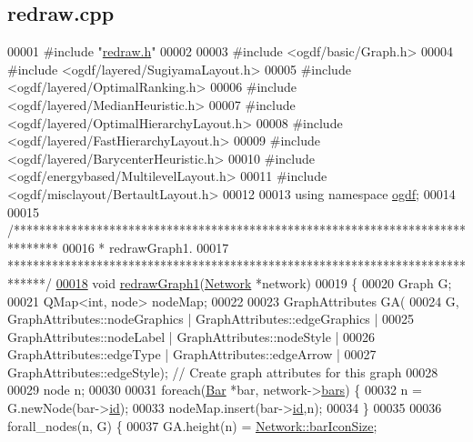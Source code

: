 \hypertarget{redraw_8cpp_source}{}\subsection{redraw.\+cpp}
\label{redraw_8cpp_source}

\begin{DoxyCode}
00001 \textcolor{preprocessor}{#include "\hyperlink{redraw_8h}{redraw.h}"}
00002 
00003 \textcolor{preprocessor}{#include <ogdf/basic/Graph.h>}
00004 \textcolor{preprocessor}{#include <ogdf/layered/SugiyamaLayout.h>}
00005 \textcolor{preprocessor}{#include <ogdf/layered/OptimalRanking.h>}
00006 \textcolor{preprocessor}{#include <ogdf/layered/MedianHeuristic.h>}
00007 \textcolor{preprocessor}{#include <ogdf/layered/OptimalHierarchyLayout.h>}
00008 \textcolor{preprocessor}{#include <ogdf/layered/FastHierarchyLayout.h>}
00009 \textcolor{preprocessor}{#include <ogdf/layered/BarycenterHeuristic.h>}
00010 \textcolor{preprocessor}{#include <ogdf/energybased/MultilevelLayout.h>}
00011 \textcolor{preprocessor}{#include <ogdf/misclayout/BertaultLayout.h>}
00012 
00013 \textcolor{keyword}{using namespace }\hyperlink{namespaceogdf}{ogdf};
00014 
00015 \textcolor{comment}{/*******************************************************************************}
00016 \textcolor{comment}{ * redrawGraph1.}
00017 \textcolor{comment}{ ******************************************************************************/}
\hypertarget{redraw_8cpp_source_l00018}{}\hyperlink{redraw_8h_ae0faf7c4b627874b04cd8fd6d32bc8aa}{00018} \textcolor{keywordtype}{void} \hyperlink{redraw_8cpp_ae0faf7c4b627874b04cd8fd6d32bc8aa}{redrawGraph1}(\hyperlink{class_network}{Network} *network)
00019 \{
00020   Graph G;
00021   QMap<int, node> nodeMap;
00022 
00023   GraphAttributes GA(
00024     G, GraphAttributes::nodeGraphics | GraphAttributes::edgeGraphics |
00025     GraphAttributes::nodeLabel | GraphAttributes::nodeStyle |
00026     GraphAttributes::edgeType | GraphAttributes::edgeArrow |
00027     GraphAttributes::edgeStyle);  \textcolor{comment}{// Create graph attributes for this graph}
00028 
00029   node n;
00030 
00031   \textcolor{keywordflow}{foreach}(\hyperlink{class_bar}{Bar} *bar, network->\hyperlink{class_network_a7fe628f7de34a96235cbd3f2cee4aff2}{bars}) \{
00032     n = G.newNode(bar->\hyperlink{class_bar_a9dc5c6a6d44fe412ae34ef8a881b8dce}{id});
00033     nodeMap.insert(bar->\hyperlink{class_bar_a9dc5c6a6d44fe412ae34ef8a881b8dce}{id},n);
00034   \}
00035 
00036   forall\_nodes(n, G) \{
00037     GA.height(n) = \hyperlink{group___graphics_gaa334bbc93b3fde219840e95e23198b53}{Network::barIconSize};

\end{DoxyCode}
